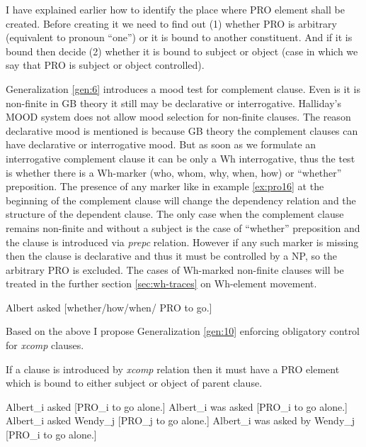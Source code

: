 I have explained earlier how to identify the place where PRO element shall be created. Before creating it we need to find out (1) whether PRO is arbitrary (equivalent to pronoun ``one'') or it is bound to another constituent. And if it is bound then decide (2) whether it is bound to subject or object (case in which we say that PRO is subject or object controlled).

Generalization \ref{gen:6} introduces a mood test for complement clause. Even is it is non-finite in GB theory it still may be declarative or interrogative. Halliday's MOOD system \cite[p.~107-167]{Halliday2004} does not allow mood selection for non-finite clauses. The reason declarative mood is mentioned is because GB theory the complement clauses can have declarative or interrogative mood. But as soon as we formulate an interrogative complement clause it can be only a Wh interrogative, thus the test is whether there is a Wh-marker (who, whom, why, when, how) or ``whether'' preposition. The presence of any marker like in example \ref{ex:pro16} at the beginning of the complement clause will change the dependency relation and the structure of the dependent clause. The only case when the complement clause remains non-finite and without a subject is the case of ``whether'' preposition and the clause is introduced via \textit{prepc} relation. However if any such marker is missing then the clause is declarative and thus it must be controlled by a NP, so the arbitrary PRO is excluded. The cases of Wh-marked non-finite clauses will be treated in the further section \ref{sec:wh-traces} on Wh-element movement.

\begin{exe}
	\ex \label{ex:pro16}Albert asked [whether/how/when/ PRO to go.]
\end{exe}

Based on the above I propose Generalization \ref{gen:10} enforcing obligatory control for \textit{xcomp} clauses.
\begin{generalization}\label{gen:10}
	If a clause is introduced by \textit{xcomp} relation then it must have a PRO element which is bound to either subject or object of parent clause.
\end{generalization}

\begin{exe}
	\ex\label{ex:pro17} Albert_i asked [PRO_i to go alone.]
	\ex\label{ex:pro18} Albert_i was asked [PRO_i to go alone.]
	\ex\label{ex:pro19} Albert_i asked Wendy_j [PRO_j to go alone.]
	\ex\label{ex:pro20} Albert_i was asked by Wendy_j [PRO_i to go alone.]
\end{exe}

